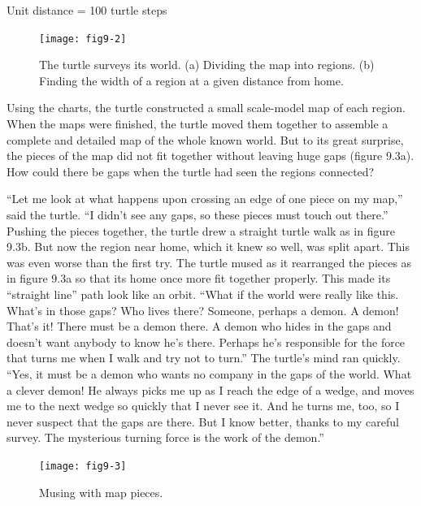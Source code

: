 \documentclass{book}
\begin{document}
Unit distance = 100 turtle steps

\vspace{0.5cm}

\begin{figure}
\begin{center}
\texttt{[image: fig9-2]}
\caption{The turtle surveys its world. (a) Dividing the map into regions. (b) Finding the width of a region at a given distance from home.}
\end{center}
\end{figure}

Using the charts, the turtle constructed a small scale-model map of
each region. When the maps were finished, the turtle moved them
together to assemble a complete and detailed map of the whole known
world. But to its great surprise, the pieces of the map did not fit together
without leaving huge gaps (figure 9.3a). How could there be gaps when
the turtle had seen the regions connected?

``Let me look at what happens upon crossing an edge of one piece on
my map,'' said the turtle. ``I didn't see any gaps, so these pieces must touch out there.'' Pushing the pieces together, the turtle drew a straight
turtle walk as in figure 9.3b. But now the region near home, which it
knew so well, was split apart. This was even worse than the first try.
The turtle mused as it rearranged the pieces as in figure 9.3a so that
its home once more fit together properly. This made its ``straight line''
path look like an orbit. ``What if the world were really like this. What's in those gaps? Who lives there? Someone, perhaps a demon. A demon! That's it! There must be a demon there. A demon who hides in the gaps and doesn't want anybody to know he's there. Perhaps he's responsible for the force that turns me when I walk and try not to turn.'' The turtle's
mind ran quickly. ``Yes, it must be a demon who wants no company in
the gaps of the world. What a clever demon! He always picks me up as
I reach the edge of a wedge, and moves me to the next wedge so quickly
that I never see it. And he turns me, too, so I never suspect that the
gaps are there. But I know better, thanks to my careful survey. The
mysterious turning force is the work of the demon.''

\begin{figure}
\begin{center}
\texttt{[image: fig9-3]}
\caption{Musing with map pieces.}
\end{center}
\end{figure}
\end{document}
